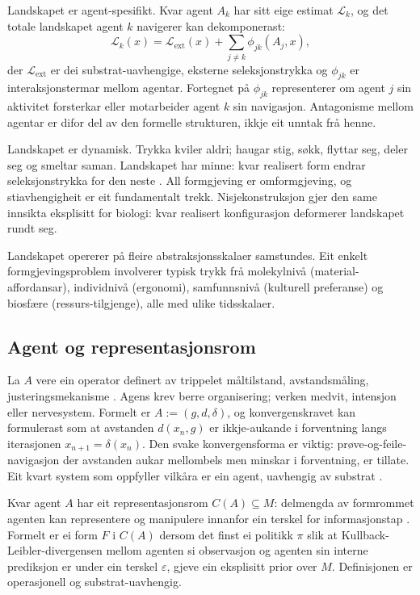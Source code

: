 \documentclass[10pt,a4paper,twocolumn]{article}
\begin{document}
Landskapet er agent-spesifikt. Kvar agent $A_k$ har sitt eige estimat $\mathcal{L}_k$, og det totale landskapet agent $k$ navigerer kan dekomponerast:
\begin{equation}
\mathcal{L}_k(x) = \mathcal{L}_{\mathrm{ext}}(x) + \sum_{j \neq k} \phi_{jk}(A_j, x),
\label{eq:landskapdekomp}
\end{equation}
der $\mathcal{L}_{\mathrm{ext}}$ er dei substrat-uavhengige, eksterne seleksjonstrykka og $\phi_{jk}$ er interaksjonstermar mellom agentar. Fortegnet på $\phi_{jk}$ representerer om agent $j$ sin aktivitet forsterkar eller motarbeider agent $k$ sin navigasjon. Antagonisme mellom agentar er difor del av den formelle strukturen, ikkje eit unntak frå henne.

Landskapet er dynamisk. Trykka kviler aldri; haugar stig, søkk, flyttar seg, deler seg og smeltar saman. Landskapet har minne: kvar realisert form endrar seleksjonstrykka for den neste \citep{arthurbrian1994}. All formgjeving er omformgjeving, og stiavhengigheit er eit fundamentalt trekk. Nisjekonstruksjon \citep{odlingsmee2003} gjer den same innsikta eksplisitt for biologi: kvar realisert konfigurasjon deformerer landskapet rundt seg.

Landskapet opererer på fleire abstraksjonsskalaer samstundes. Eit enkelt formgjevingsproblem involverer typisk trykk frå molekylnivå (material-affordansar), individnivå (ergonomi), samfunnsnivå (kulturell preferanse) og biosfære (ressurs-tilgjenge), alle med ulike tidsskalaer.

\subsection{Agent og representasjonsrom}

La $A$ vere ein operator definert av trippelet måltilstand, avstandsmåling, justeringsmekanisme \citep{rosenblueth1943, ashby1956}. Agens krev berre organisering; verken medvit, intensjon eller nervesystem. Formelt er $A := (g, d, \delta)$, og konvergenskravet kan formulerast som at avstanden $d(x_n, g)$ er ikkje-aukande i forventning langs iterasjonen $x_{n+1} = \delta(x_n)$. Den svake konvergensforma er viktig: prøve-og-feile-navigasjon der avstanden aukar mellombels men minskar i forventning, er tillate. Eit kvart system som oppfyller vilkåra er ein agent, uavhengig av substrat \citep{levin2022}.

Kvar agent $A$ har eit representasjonsrom $C(A) \subseteq M$: delmengda av formrommet agenten kan representere og manipulere innanfor ein terskel for informasjonstap \citep{fieldslevin2022}. Formelt er ei form $F$ i $C(A)$ dersom det finst ei politikk $\pi$ slik at Kullback-Leibler-divergensen mellom agenten si observasjon og agenten sin interne prediksjon er under ein terskel $\varepsilon$, gjeve ein eksplisitt prior over $M$. Definisjonen er operasjonell og substrat-uavhengig.
\end{document}
